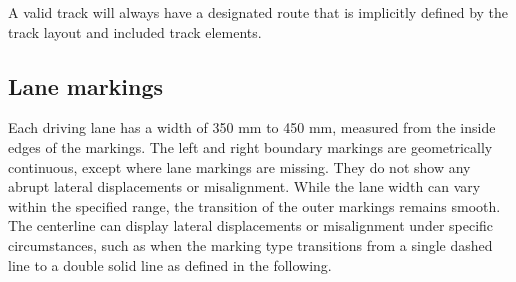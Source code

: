 A valid track will always have a designated route that is implicitly defined by the track layout and included track elements.

\subsection{Lane markings}
\label{lane_markings}

Each driving lane has a width of 350 mm to 450 mm, measured from the inside edges of the markings.
The left and right boundary markings are geometrically continuous, except where lane markings are missing.
They do not show any abrupt lateral displacements or misalignment.
While the lane width can vary within the specified range, the transition of the outer markings remains smooth.
The centerline can display lateral displacements or misalignment under specific circumstances, such as when the marking type transitions from a single dashed line to a double solid line as defined in the following.

